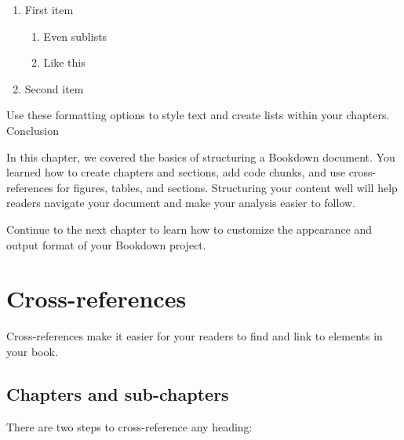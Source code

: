 \documentclass[
]{book}
\providecommand{\tightlist}{%
  \setlength{\itemsep}{0pt}\setlength{\parskip}{0pt}}
\theoremstyle{definition}
\theoremstyle{definition}
\theoremstyle{definition}
\theoremstyle{definition}
\theoremstyle{remark}
\begin{document}
\begin{enumerate}
\def\labelenumi{\arabic{enumi}.}
\tightlist
\item
  First item

  \begin{enumerate}
  \def\labelenumii{\roman{enumii}.}
  \tightlist
  \item
    Even sublists
  \item
    Like this
  \end{enumerate}
\item
  Second item
\end{enumerate}

Use these formatting options to style text and create lists within your chapters.
Conclusion

In this chapter, we covered the basics of structuring a Bookdown document. You learned how to create chapters and sections, add code chunks, and use cross-references for figures, tables, and sections. Structuring your content well will help readers navigate your document and make your analysis easier to follow.

Continue to the next chapter to learn how to customize the appearance and output format of your Bookdown project.

\chapter{Cross-references}\label{cross}

Cross-references make it easier for your readers to find and link to elements in your book.

\section{Chapters and sub-chapters}\label{chapters-and-sub-chapters}

There are two steps to cross-reference any heading:
\end{document}
